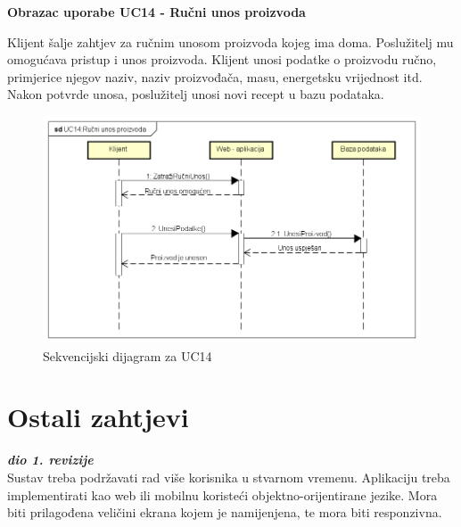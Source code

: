 			\begin{large}{\textbf{Obrazac uporabe UC14 - Ručni unos proizvoda}}\end{large}
			
			Klijent šalje zahtjev za ručnim unosom proizvoda kojeg ima doma. Poslužitelj mu omogućava pristup i unos proizvoda. Klijent unosi podatke o proizvodu ručno, primjerice njegov naziv, naziv proizvođača, masu, energetsku vrijednost itd. Nakon potvrde unosa, poslužitelj unosi novi recept u bazu podataka.
				
					
				\begin{figure}[H]
			\includegraphics[scale=0.4]{dijagrami/SEQ_UC14.png} %
			\centering
			\caption{Sekvencijski dijagram za UC14}
			\label{SEQ_UC14}
		\end{figure}

		\section{Ostali zahtjevi}
		
			\textbf{\textit{dio 1. revizije}}\\
		 
			 Sustav treba podržavati rad više korisnika u stvarnom vremenu. Aplikaciju treba implementirati kao web ili mobilnu koristeći objektno-orijentirane jezike. Mora biti prilagođena veličini ekrana kojem je namijenjena, te mora biti responzivna. 
			 
			 
			 
	